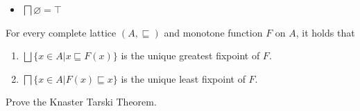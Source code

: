 {{\begin{example}
\begin{itemize}
        \item $\bigsqcap \varnothing = \top$
    \end{itemize}
\end{example}
\begin{theorem}
    For every complete lattice $(A,\sqsubseteq)$ and monotone function $F$ on $A$, it holds that
    \begin{enumerate}
        \item $\bigsqcup \{x\in A| x \sqsubseteq F(x)\}$ is the unique greatest fixpoint of $F$. 
        \item $\bigsqcap \{x \in A| F(x) \sqsubseteq x\}$ is the unique least fixpoint of $F$. 
    \end{enumerate}
\end{theorem}


\begin{homework}
    Prove the Knaster Tarski Theorem.
\end{homework}

 }} %
